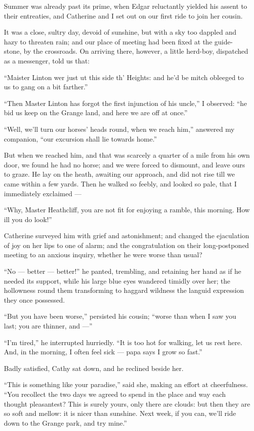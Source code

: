 \par Summer was already past its prime, when Edgar reluctantly yielded his assent to their entreaties, and Catherine and I set out on our first ride to join her cousin.
\par It was a close, sultry day, devoid of sunshine, but with a sky too dappled and hazy to threaten rain; and our place of meeting had been fixed at the guide-stone, by the crossroads. On arriving there, however, a little herd-boy, dispatched as a messenger, told us that:
\par “Maister Linton wer just ut this side th' Heights: and he'd be mitch obleeged to us to gang on a bit farther.”
\par “Then Master Linton has forgot the first injunction of his uncle,” I observed: “he bid us keep on the Grange land, and here we are off at once.”
\par “Well, we'll turn our horses' heads round, when we reach him,” answered my companion, “our excursion shall lie towards home.”
\par But when we reached him, and that was scarcely a quarter of a mile from his own door, we found he had no horse; and we were forced to dismount, and leave ours to graze. He lay on the heath, awaiting our approach, and did not rise till we came within a few yards. Then he walked so feebly, and looked so pale, that I immediately exclaimed —
\par “Why, Master Heathcliff, you are not fit for enjoying a ramble, this morning. How ill you do look!”
\par Catherine surveyed him with grief and astonishment; and changed the ejaculation of joy on her lips to one of alarm; and the congratulation on their long-postponed meeting to an anxious inquiry, whether he were worse than usual?
\par “No — better — better!” he panted, trembling, and retaining her hand as if he needed its support, while his large blue eyes wandered timidly over her; the hollowness round them transforming to haggard wildness the languid expression they once possessed.
\par “But you have been worse,” persisted his cousin; “worse than when I saw you last; you are thinner, and —”
\par “I'm tired,” he interrupted hurriedly. “It is too hot for walking, let us rest here. And, in the morning, I often feel sick — papa says I grow so fast.”
\par Badly satisfied, Cathy sat down, and he reclined beside her.
\par “This is something like your paradise,” said she, making an effort at cheerfulness. “You recollect the two days we agreed to spend in the place and way each thought pleasantest? This is surely yours, only there are clouds: but then they are so soft and mellow: it is nicer than sunshine. Next week, if you can, we'll ride down to the Grange park, and try mine.”
